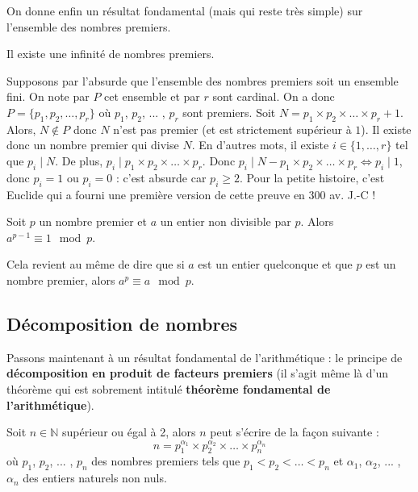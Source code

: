 	On donne enfin un résultat fondamental (mais qui reste très simple) sur l'ensemble des nombres premiers.

	\begin{formula}
		Il existe une infinité de nombres premiers.
	\end{formula}

	\begin{demonstration}
		Supposons par l'absurde que l'ensemble des nombres premiers soit un ensemble fini. On note par $P$ cet ensemble et par $r$ sont cardinal. On a donc $P = \{p_1, p_2, \dots, p_r\}$ où $p_1$, $p_2$, ... , $p_r$ sont premiers. \newpar
		Soit $N = p_1 \times p_2 \times \dots \times p_r + 1$. Alors, $N \notin P$ donc $N$ n'est pas premier (et est strictement supérieur à $1$). Il existe donc un nombre premier qui divise $N$.
		\newpar
		En d'autres mots, il existe $i \in \{1, \dots, r\}$ tel que $p_i \mid N$. De plus, $p_i \mid p_1 \times p_2 \times \dots \times p_r$.
		\newpar
		Donc $p_i \mid N -  p_1 \times p_2 \times \dots \times p_r \iff p_i \mid 1$, donc $p_i = 1$ ou $p_i = 0$ : c'est absurde car $p_i \geq 2$.
		\newpar
		Pour la petite histoire, c'est Euclide qui a fourni une première version de cette preuve en 300 av. J.-C !
	\end{demonstration}

	\begin{formula}
		\label{thm:fermat}
		Soit $p$ un nombre premier et $a$ un entier non divisible par $p$. Alors $a^{p-1} \equiv 1 \mod p$.
	\end{formula}

	\begin{tip}
		Cela revient au même de dire que si $a$ est un entier quelconque et que $p$ est un nombre premier, alors $a^p \equiv a \mod p$.
	\end{tip}

	\subsection{Décomposition de nombres}

	Passons maintenant à un résultat fondamental de l'arithmétique : le principe de \textbf{décomposition en produit de facteurs premiers} (il s'agit même là d'un théorème qui est sobrement intitulé \textbf{théorème fondamental de l'arithmétique}).

	\begin{formula}
		Soit $n \in \mathbb{N}$ supérieur ou égal à 2, alors $n$ peut s'écrire de la façon suivante :
		\[ n = p_{1}^{\alpha_1} \times p_{2}^{\alpha_2} \times \dots \times p_{n}^{\alpha_n} \]
		où $p_1$, $p_2$, ... , $p_n$ des nombres premiers tels que $p_1 < p_2 < \dots < p_n$ et $\alpha_1$, $\alpha_2$, ... , $\alpha_n$ des entiers naturels non nuls.
	\end{formula}

